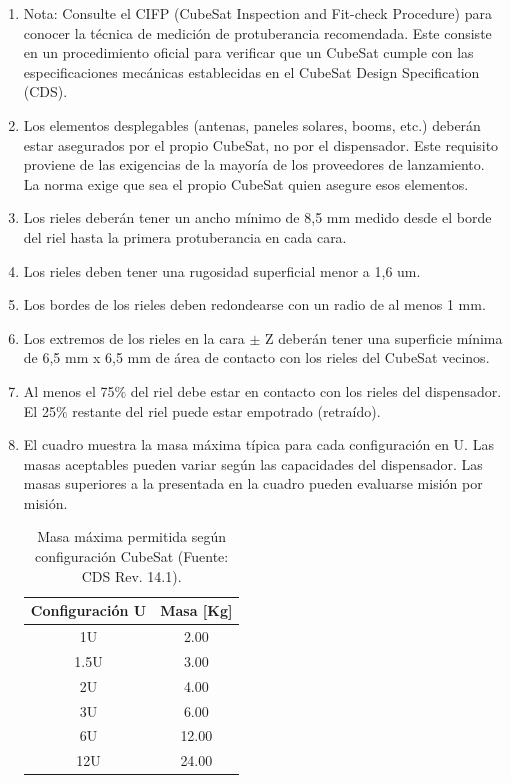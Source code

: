 \documentclass[11pt,a4paper,twoside]{report}
\begin{document}
\begin{enumerate}
		\item Nota: Consulte el CIFP (CubeSat Inspection and Fit-check Procedure) para conocer la técnica de medición de protuberancia recomendada. Este consiste en un procedimiento oficial para verificar que un CubeSat cumple con las especificaciones mecánicas establecidas en el CubeSat Design Specification (CDS).
		
		\item Los elementos desplegables (antenas, paneles solares, booms, etc.) deberán estar asegurados por el propio CubeSat, no por el dispensador. Este requisito proviene de las exigencias de la mayoría de los proveedores de lanzamiento. La norma exige que sea el propio CubeSat quien asegure esos elementos.
		
		\item Los rieles deberán tener un ancho mínimo de 8,5 mm medido desde el borde del riel hasta la primera protuberancia en cada cara.
		
		\item Los rieles deben tener una rugosidad superficial menor a 1,6 um.
		
		\item Los bordes de los rieles deben redondearse con un radio de al menos 1 mm.
		
		\item Los extremos de los rieles en la cara  $\pm$ Z deberán tener una superficie mínima de 6,5 mm x 6,5 mm de área de contacto con los rieles del CubeSat vecinos.
		
		\item Al menos el 75$\%$ del riel debe estar en contacto con los rieles del dispensador. El 25$\%$ restante del riel puede estar empotrado (retraído).
		
		\item El cuadro  muestra la masa máxima típica para cada configuración en U. Las masas aceptables pueden variar según las capacidades del dispensador. Las masas superiores a la presentada en la cuadro pueden evaluarse misión por misión.
		
		\begin{table}[h!]
			\centering
			\renewcommand{\arraystretch}{1}
			\begin{tabular}{|c|c|}
				\hline
				Configuración U & Masa [Kg]   \\
				\hline
				1U   & 2.00  \\ \hline
				1.5U & 3.00  \\ \hline
				2U   & 4.00  \\ \hline
				3U   & 6.00  \\ \hline
				6U   & 12.00 \\ \hline
				12U  & 24.00 \\ \hline
			\end{tabular}
			\caption{Masa máxima permitida según configuración CubeSat (Fuente: CDS Rev. 14.1).}
			\label{tab:cubesat_mass}
		\end{table}
		

\end{enumerate}
\end{document}
